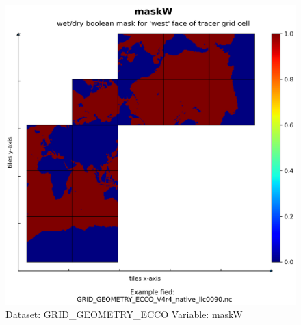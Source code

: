 \begin{figure}[H]
\centering
\includegraphics[width=\textwidth]{../images/plots/native_plots_coords/Geometry_Parameters_for_the_Lat-Lon-Cap_90_(llc90)_Native_Model_Grid_(Version_4_Release_4)/maskW.png}
\caption{Dataset: GRID\_GEOMETRY\_ECCO Variable: maskW}
\label{tab:table-GRID_GEOMETRY_ECCO_maskW-Plot}
\end{figure}
\pagebreak
